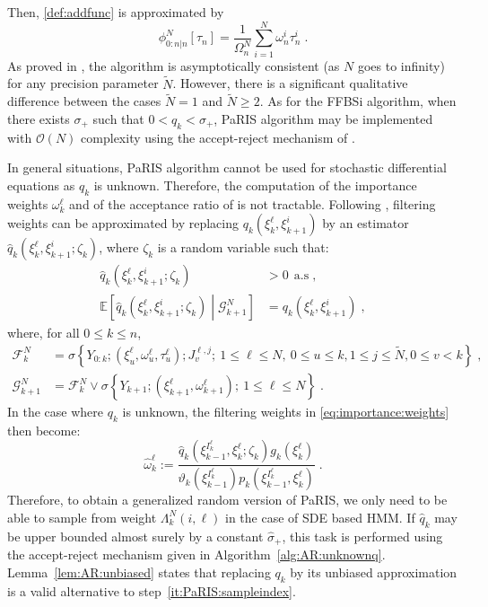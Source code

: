 \documentclass[12pt]{article}
\newcommand{\eqsp}{\;}
\newcommand{\1}{\mathrm{1}}
\newcommand{\qk}{q_{k}}
\begin{document}
Then, \eqref{def:addfunc} is approximated by
\[
\phi_{0:n\vert n}^N[\tau_n] = \frac{1}{\Omega_n^N}\sum_{i=1}^N \omega^{i}_n \tau_n^i\eqsp.
\] 
As proved in \cite{olsson:westerborn:2016}, the algorithm is asymptotically consistent (as $N$ goes to infinity) for any precision parameter $\tilde N$. However, there is a significant qualitative difference between the cases $\tilde{N} = 1$ and $\tilde{N} \geq 2$. As for the FFBSi algorithm,  when there exists $\sigma_+$ such that $0<\qk <\sigma_+$, PaRIS algorithm may be implemented with $\mathcal{O}(N)$ complexity using the accept-reject mechanism of \cite{douc:garivier:moulines:olsson:2011}.

In general situations, PaRIS algorithm cannot be used for stochastic differential equations as $\qk$ is unknown. Therefore, the computation of the importance weights $\omega_{k}^{\ell}$ and of the acceptance ratio of \cite{douc:garivier:moulines:olsson:2011} is not tractable. Following \cite{fearnhead:papaspiliopoulos:roberts:2008,olsson:strojby:2011}, filtering weights can be approximated by replacing $\qk(\xi^{\ell}_{k},\xi_{k+1}^{i})$  by an  estimator $\widehat{q}_k(\xi^{\ell}_{k},\xi_{k+1}^{i};\zeta_k)$, where $\zeta_k$ is a random variable such that:
\begin{align*}
\widehat{q}_k(\xi^{\ell}_{k},\xi_{k+1}^{i};\zeta_k)&> 0~~\text{a.s}\eqsp,\\
\mathbb{E}\left[\widehat{q}_k(\xi^{\ell}_{k},\xi_{k+1}^{i};\zeta_k)\middle| \mathcal{G}_{k+1}^N\right] &= \qk(\xi^{\ell}_{k},\xi_{k+1}^{i})\eqsp,
\end{align*}
where, for all $0\le k \le n$, 
\begin{align*}
\mathcal{F}_{k}^N &= \sigma\left\{Y_{0:k};(\xi^{\ell}_{u},\omega^{\ell}_{u},\tau^{\ell}_{u});J_{v}^{\ell,j};~1\le \ell\le N,~0\le u\le k, 1\le j \le \widetilde{N}, 0\le v< k\right\}\eqsp,\\
\mathcal{G}_{k+1}^N &= \mathcal{F}_{k}^N \vee \sigma\left\{Y_{k+1};(\xi^{\ell}_{k+1},\omega^{\ell}_{k+1});~1\le \ell\le N\right\}\eqsp.
\end{align*}
In the case where $\qk$ is unknown, the filtering weights in \eqref{eq:importance:weights} then become:
\begin{equation}
\label{eq:random:weight}
\widehat{\omega}^{\ell}_k := \frac{\widehat{q}_k(\xi_{k-1}^{I^{\ell}_k},\xi^{\ell}_k;\zeta_k)g_k(\xi^{\ell}_k)}{\vartheta_k(\xi^{I^{\ell}_k}_{k-1}) p_k (\xi_{k-1}^{I^{\ell}_k},\xi^{\ell}_k)}\eqsp.
\end{equation}
Therefore, to obtain a generalized random version of PaRIS, we only need to be able to sample from weight $\Lambda_k^N(i,\ell)$ in the case of SDE based HMM. If $\widehat{q}_k$ may be upper bounded almost surely by a constant $\hat{\sigma}_+$, this task is performed using the accept-reject mechanism given in Algorithm~\ref{alg:AR:unknownq}. Lemma~\ref{lem:AR:unbiased} states that replacing  $\qk$ by its unbiased approximation is a valid alternative to step~\eqref{it:PaRIS:sampleindex}.\\
\end{document}
